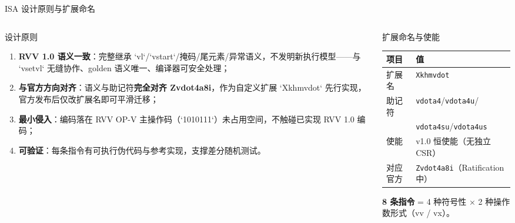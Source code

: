 \documentclass[aspectratio=169]{beamer}
\newcommand{\smalltable}[1]{\par\centering\scriptsize #1\par}
\begin{document}
\begin{frame}{ISA 设计原则与扩展命名}
\begin{columns}[T]
\begin{column}{0.55\textwidth}
\begin{block}{设计原则}
\begin{enumerate}
  \item \textbf{RVV 1.0 语义一致}：完整继承 `vl`/`vstart`/掩码/尾元素/异常语义，不发明新执行模型——与 `vsetvl` 无缝协作、golden 语义唯一、编译器可安全处理；
  \item \textbf{与官方方向对齐}：语义与助记符\textbf{完全对齐 Zvdot4a8i}，作为自定义扩展 `Xkhmvdot` 先行实现，官方发布后仅改扩展名即可平滑迁移；
  \item \textbf{最小侵入}：编码落在 RVV OP-V 主操作码（`1010111`）未占用空间，不触碰已实现 RVV 1.0 编码；
  \item \textbf{可验证}：每条指令有可执行伪代码与参考实现，支撑差分随机测试。
\end{enumerate}
\end{block}
\end{column}
\begin{column}{0.43\textwidth}
\begin{block}{扩展命名与使能}
\smalltable{%
\begin{tabular}{@{}ll@{}}
\toprule
项目 & 值 \\
\midrule
扩展名 & \texttt{Xkhmvdot} \\
助记符 & \texttt{vdota4}/\texttt{vdota4u}/\\
 & \texttt{vdota4su}/\texttt{vdota4us} \\
使能 & v1.0 恒使能（无独立 CSR） \\
对应官方 & \texttt{Zvdot4a8i}（Ratification 中） \\
\bottomrule
\end{tabular}}
\end{block}
\vspace{0.3em}
\textbf{8 条指令} = 4 种符号性 × 2 种操作数形式（vv / vx）。
\end{column}
\end{columns}
\end{frame}
\end{document}
